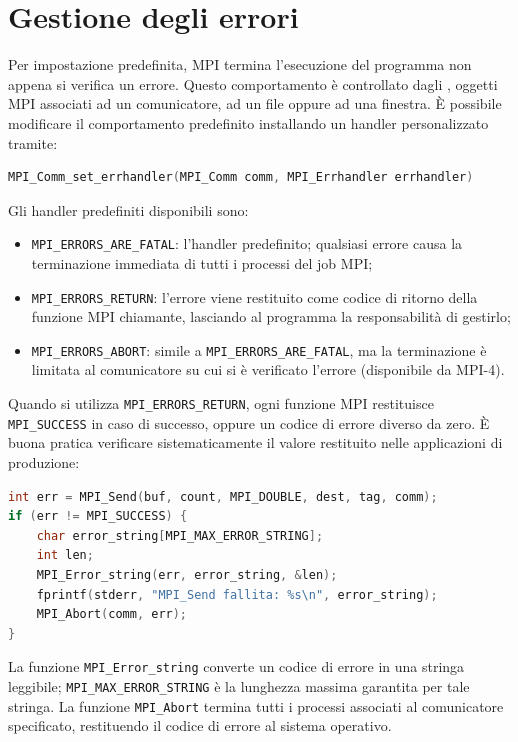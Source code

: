 \section{Gestione degli errori} 
Per impostazione predefinita, MPI termina l'esecuzione del programma non appena si verifica un errore. 
Questo comportamento è controllato dagli , oggetti MPI associati ad un comunicatore, ad un file oppure ad una finestra. È possibile modificare il comportamento predefinito installando un handler personalizzato tramite:
\begin{lstlisting}[language=C, numbers=none]
MPI_Comm_set_errhandler(MPI_Comm comm, MPI_Errhandler errhandler)
\end{lstlisting}
Gli handler predefiniti disponibili sono:
\begin{itemize}
    \item \texttt{MPI\_ERRORS\_ARE\_FATAL}: l'handler predefinito; qualsiasi errore causa la terminazione immediata di tutti i processi del job MPI;
    \item \texttt{MPI\_ERRORS\_RETURN}: l'errore viene restituito come codice di ritorno della funzione MPI chiamante, lasciando al programma la responsabilità di gestirlo;
    \item \texttt{MPI\_ERRORS\_ABORT}: simile a \texttt{MPI\_ERRORS\_ARE\_FATAL}, ma la terminazione è limitata al comunicatore su cui si è verificato l'errore (disponibile da MPI-4).
\end{itemize}

Quando si utilizza \texttt{MPI\_ERRORS\_RETURN}, ogni funzione MPI restituisce \texttt{MPI\_SUCCESS} in caso di successo, oppure un codice di errore diverso da zero. È buona pratica verificare sistematicamente il valore restituito nelle applicazioni di produzione:
\begin{lstlisting}[language=C, numbers=none]
int err = MPI_Send(buf, count, MPI_DOUBLE, dest, tag, comm);
if (err != MPI_SUCCESS) {
    char error_string[MPI_MAX_ERROR_STRING];
    int len;
    MPI_Error_string(err, error_string, &len);
    fprintf(stderr, "MPI_Send fallita: %s\n", error_string);
    MPI_Abort(comm, err);
}
\end{lstlisting}
La funzione \texttt{MPI\_Error\_string} converte un codice di errore in una stringa leggibile; \texttt{MPI\_MAX\_ERROR\_STRING} è la lunghezza massima garantita per tale stringa. La funzione \texttt{MPI\_Abort} termina tutti i processi associati al comunicatore specificato, restituendo il codice di errore al sistema operativo.

